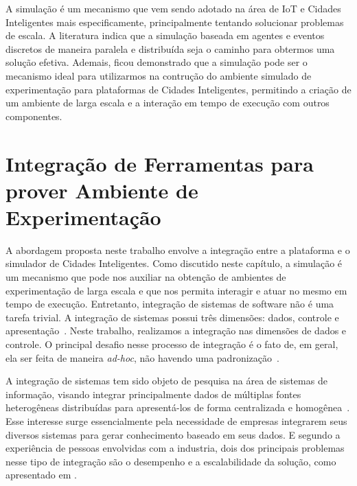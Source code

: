 A simulação é um mecanismo que vem sendo adotado na área de IoT e Cidades Inteligentes mais especificamente, principalmente tentando solucionar problemas de escala.
A literatura indica que a simulação baseada em agentes e eventos discretos de maneira paralela e distribuída seja o caminho para obtermos uma solução efetiva.
Ademais, ficou demonstrado que a simulação pode ser o mecanismo ideal para utilizarmos na contrução do ambiente simulado de experimentação para plataformas de Cidades Inteligentes, permitindo a criação
de um ambiente de larga escala e a interação em tempo de execução com outros componentes.

\section{Integração de Ferramentas para prover Ambiente de Experimentação}


A abordagem proposta neste trabalho envolve a integração entre a plataforma e o simulador de Cidades Inteligentes.
Como discutido neste capítulo, a simulação é um mecanismo que pode nos auxiliar na obtenção de ambientes de experimentação de larga escala e que nos permita interagir e atuar no mesmo em tempo de execução.
Entretanto, integração de sistemas de software não é uma tarefa trivial.
A integração de sistemas possui três dimensões: dados, controle e apresentação~\cite{wasserman_1990}.
Neste trabalho, realizamos a integração nas dimensões de dados e controle.
O principal desafio nesse processo de integração é o fato de, em geral, ela ser feita de maneira \textit{ad-hoc}, não havendo uma padronização~\cite{wasserman_1990}.

A integração de sistemas tem sido objeto de pesquisa na área de sistemas de informação, visando integrar principalmente dados de múltiplas fontes heterogêneas distribuídas para apresentá-los de forma
centralizada e homogênea~\cite{genesereth_1997}.
Esse interesse surge essencialmente pela necessidade de empresas integrarem seus diversos sistemas para gerar conhecimento baseado em seus dados.
E segundo a experiência de pessoas envolvidas com a industria, dois dos principais problemas nesse tipo de integração são o desempenho e a escalabilidade da solução, como apresentado em \cite{halevy_2005}.

